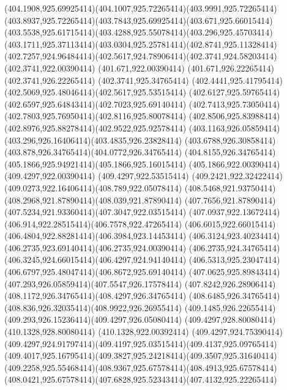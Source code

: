 {{	\curveto(404.1908,925.69925414)(404.1007,925.72265414)(403.9991,925.72265414)
	\curveto(403.8937,925.72265414)(403.7843,925.69925414)(403.671,925.66015414)
	\curveto(403.5538,925.61715414)(403.4288,925.55078414)(403.296,925.45703414)
	\curveto(403.1711,925.37113414)(403.0304,925.25781414)(402.8741,925.11328414)
	\curveto(402.7257,924.96484414)(402.5617,924.78906414)(402.3741,924.58203414)
	\lineto(402.3741,922.00390414)
	\lineto(401.671,922.00390414)
	\lineto(401.671,926.22265414)
	\lineto(402.3741,926.22265414)
	\lineto(402.3741,925.34765414)
	\curveto(402.4441,925.41795414)(402.5069,925.48046414)(402.5617,925.53515414)
	\curveto(402.6127,925.59765414)(402.6597,925.64843414)(402.7023,925.69140414)
	\curveto(402.7413,925.73050414)(402.7803,925.76950414)(402.8116,925.80078414)
	\curveto(402.8506,925.83988414)(402.8976,925.88278414)(402.9522,925.92578414)
	\curveto(403.1163,926.05859414)(403.296,926.16406414)(403.4835,926.23828414)
	\curveto(403.6788,926.30858414)(403.878,926.34765414)(404.0772,926.34765414)
	\curveto(404.8155,926.34765414)(405.1866,925.94921414)(405.1866,925.16015414)
	\lineto(405.1866,922.00390414)
	\closepath
	\moveto(409.4297,922.00390414)
	\lineto(409.4297,922.53515414)
	\curveto(409.2421,922.32422414)(409.0273,922.16406414)(408.789,922.05078414)
	\curveto(408.5468,921.93750414)(408.2968,921.87890414)(408.039,921.87890414)
	\curveto(407.7656,921.87890414)(407.5234,921.93360414)(407.3047,922.03515414)
	\curveto(407.0937,922.13672414)(406.914,922.28515414)(406.7578,922.47265414)
	\curveto(406.6015,922.66015414)(406.4804,922.88281414)(406.3984,923.14453414)
	\curveto(406.3124,923.40234414)(406.2735,923.69140414)(406.2735,924.00390414)
	\curveto(406.2735,924.34765414)(406.3245,924.66015414)(406.4297,924.94140414)
	\curveto(406.5313,925.23047414)(406.6797,925.48047414)(406.8672,925.69140414)
	\curveto(407.0625,925.89843414)(407.293,926.05859414)(407.5547,926.17578414)
	\curveto(407.8242,926.28906414)(408.1172,926.34765414)(408.4297,926.34765414)
	\curveto(408.6485,926.34765414)(408.836,926.32035414)(408.9922,926.26955414)
	\curveto(409.1485,926.22655414)(409.293,926.15236414)(409.4297,926.05080414)
	\lineto(409.4297,928.80080414)
	\lineto(410.1328,928.80080414)
	\lineto(410.1328,922.00392414)
	\closepath
	\moveto(409.4297,924.75390414)
	\curveto(409.4297,924.91797414)(409.4197,925.03515414)(409.4137,925.09765414)
	\curveto(409.4017,925.16795414)(409.3827,925.24218414)(409.3507,925.31640414)
	\curveto(409.2258,925.55468414)(408.9367,925.67578414)(408.4913,925.67578414)
	\curveto(408.0421,925.67578414)(407.6828,925.52343414)(407.4132,925.22265414)
}}
